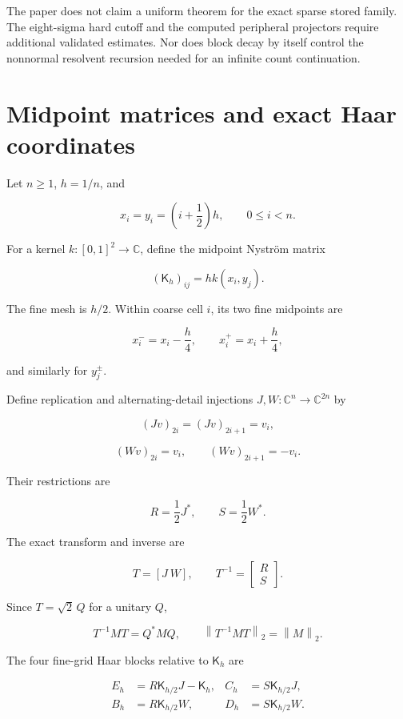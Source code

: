 \documentclass[11pt]{article}
\theoremstyle{definition}
\theoremstyle{remark}
\newcommand{\norm}[1]{\left\lVert #1\right\rVert}
\newcommand{\C}{\mathbb C}
\begin{document}
The paper does not claim a uniform theorem for the exact sparse stored family.
The eight-sigma hard cutoff and the computed peripheral projectors require
additional validated estimates.  Nor does block decay by itself control the
nonnormal resolvent recursion needed for an infinite count continuation.

\section{Midpoint matrices and exact Haar coordinates}
\label{sec:coordinates}

Let $n\ge1$, $h=1/n$, and

\[
x_i=y_i=\left(i+\frac12\right)h,\qquad0\le i<n.
\]

For a kernel $k:[0,1]^2\to\C$, define the midpoint Nystr\"om matrix

\begin{equation}
 (\mathsf K_h)_{ij}=h k(x_i,y_j).
 \label{eq:nystrom}
\end{equation}

The fine mesh is $h/2$.  Within coarse cell $i$, its two fine midpoints are

\[
x_i^- =x_i-\frac h4,\qquad x_i^+=x_i+\frac h4,
\]

and similarly for $y_j^\pm$.

Define replication and alternating-detail injections $J,W:\C^n\to\C^{2n}$
by

\[
(Jv)_{2i}=(Jv)_{2i+1}=v_i,
\]

\[
(Wv)_{2i}=v_i,\qquad(Wv)_{2i+1}=-v_i.
\]

Their restrictions are

\[
R=\frac12J^*,\qquad S=\frac12W^*.
\]

The exact transform and inverse are

\[
T=[J\ W],\qquad T^{-1}=\begin{bmatrix}R\\S\end{bmatrix}.
\]

Since $T=\sqrt2\,Q$ for a unitary $Q$,

\begin{equation}
T^{-1}MT=Q^*MQ,\qquad\norm{T^{-1}MT}_2=\norm{M}_2.
\label{eq:norm-invariance}
\end{equation}

The four fine-grid Haar blocks relative to $\mathsf K_h$ are

\begin{align}
E_h&=R\mathsf K_{h/2}J-\mathsf K_h,
&C_h&=S\mathsf K_{h/2}J,\label{eq:blocks-one}\\
B_h&=R\mathsf K_{h/2}W,
&D_h&=S\mathsf K_{h/2}W.\label{eq:blocks-two}
\end{align}
\end{document}
